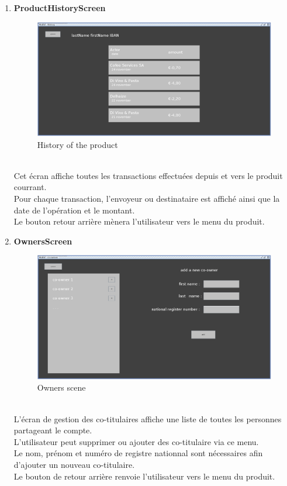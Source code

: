 \documentclass[../rapport.tex]{subfiles}
\begin{document}
\begin{enumerate}
\item \textbf{ProductHistoryScreen}\\
		\begin{figure}[h!]
				\centering \includegraphics[scale=0.2]{ressources/photos_diagrammes/app1/gui/productHistory.jpg}
				\caption{History of the product}
		\end{figure}
		\\
Cet écran affiche toutes les transactions effectuées depuis et vers le produit courrant.\\
Pour chaque transaction, l'envoyeur ou destinataire est affiché ainsi que la date de l'opération et le montant.\\
Le bouton retour arrière mènera l'utilisateur vers le menu du produit.
\newpage
\item \textbf{OwnersScreen}\\
		\begin{figure}[h!]
				\centering \includegraphics[scale=0.2]{ressources/photos_diagrammes/app1/gui/owners.jpg}
				\caption{Owners scene}
		\end{figure}
		\\
L'écran de gestion des co-titulaires affiche une liste de toutes les personnes partageant le compte.\\
L'utilisateur peut supprimer ou ajouter des co-titulaire via ce menu.\\
Le nom, prénom et numéro de registre nationnal sont nécessaires afin d'ajouter un nouveau co-titulaire.\\
Le bouton de retour arrière renvoie l'utilisateur vers le menu du produit.

\end{enumerate}
\end{document}
